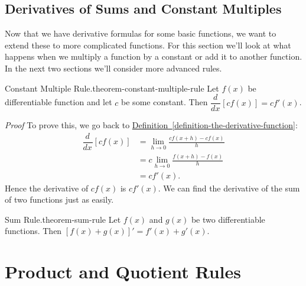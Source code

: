 \documentclass[10pt,]{book}
\makeatletter
\renewcommand*{\proofname}{Proof}
\renewenvironment{proof}[1][\proofname]{\par
  \pushQED{\qed}%
  \normalfont \topsep6\p@\@plus6\p@\relax
  \trivlist
  \item\relax
    {\itshape
    #1\@addpunct{.}}\hspace\labelsep\ignorespaces
}{%
  \popQED\endtrivlist\@endpefalse
}
\numberwithin{equation}{section}
\newcommand{\dv}[3][]{\dfrac{d^{#1} #2}{d #3^{#1}}}
\makeatother
\begin{document}
\subsection[{Derivatives of Sums and Constant Multiples}]{Derivatives of Sums and Constant Multiples}\label{subsection-derivatives-of-sums-and-constant-multiples}
\hypertarget{p-134}{}%
Now that we have derivative formulas for some basic functions, we want to extend these to more complicated functions. For this section we'll look at what happens when we multiply a function by a constant or add it to another function. In the next two sections we'll consider more advanced rules.%
\begin{theorem}{Constant Multiple Rule.}{}{theorem-constant-multiple-rule}%
\hypertarget{p-135}{}%
Let \(f(x)\) be differentiable function and let \(c\) be some constant. Then \(\dv{}{x}[cf(x)] = cf'(x)\).%
\end{theorem}
\begin{proof}\hypertarget{proof-2}{}
\hypertarget{p-136}{}%
To prove this, we go back to \hyperref[definition-the-derivative-function]{Definition~\ref{definition-the-derivative-function}}:%
\begin{align*}
\dv{}{x}[cf(x)] & = \lim_{h\to0}\frac{cf(x+h) - cf(x)}{h} \\
& = c\lim_{h\to0}\frac{f(x+h) - f(x)}{h} \\
& = cf'(x). 
\end{align*}
Hence the derivative of \(cf(x)\) is \(cf'(x)\).%
\end{proof}
\hypertarget{p-137}{}%
We can find the derivative of the sum of two functions just as easily.%
\begin{theorem}{Sum Rule.}{}{theorem-sum-rule}%
\hypertarget{p-138}{}%
Let \(f(x)\) and \(g(x)\) be two differentiable functions. Then \([f(x)+g(x)]' = f'(x) + g'(x)\).%
\end{theorem}
%
%
\typeout{************************************************}
\typeout{************************************************}
%
\section[{Product and Quotient Rules}]{Product and Quotient Rules}\label{section-product-and-quotient-rules}
%
%
\typeout{************************************************}
\typeout{************************************************}
%
\end{document}
